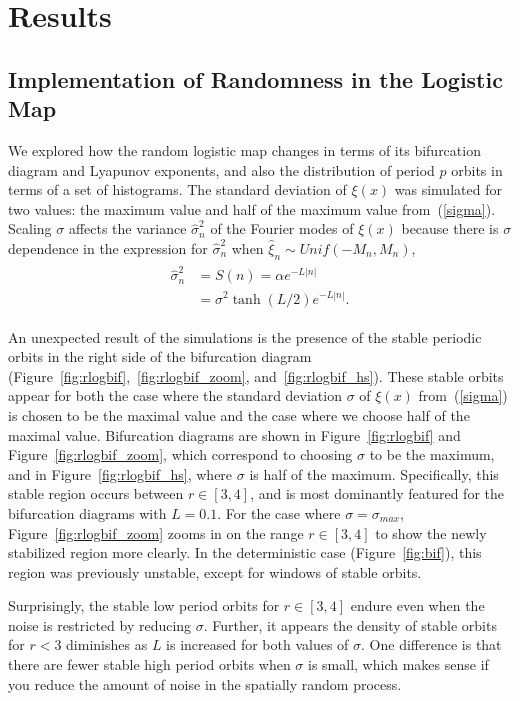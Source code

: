 \chapter{Results}\label{results}
\section{Implementation of Randomness in the Logistic Map}
We explored how the random logistic map changes in terms of its
bifurcation diagram and Lyapunov exponents, and also the distribution
of period $p$ orbits in terms of a set of histograms. The standard deviation of
$\xi(x)$ was simulated for two values: the maximum value and
half of the maximum value from~(\ref{sigma}). Scaling $\sigma$ affects
the variance $\hat{\sigma}_n^2$ of the Fourier modes of $\xi(x)$
because there is $\sigma$ dependence in the expression for
$\hat{\sigma}_n^2$ when $\hat{\xi}_n \sim Unif(-M_n,M_n)$,
\begin{align*}
\begin{split}
\hat{\sigma}_n^2 &= S(n) = \alpha e^{-L|n|}\\
&= \sigma^2 \tanh(L/2) e^{-L|n|}.
\end{split}
\end{align*}

An unexpected result of the simulations is the presence of the stable
periodic orbits in the right side of the bifurcation diagram
(Figure~\ref{fig:rlogbif},~\ref{fig:rlogbif_zoom}, and~\ref{fig:rlogbif_hs}). These
stable orbits appear for both the case where the standard deviation $\sigma$ of
$\xi(x)$ from~(\ref{sigma}) is chosen to be the maximal value and the
case where we choose half of the maximal
value. Bifurcation diagrams are shown in Figure~\ref{fig:rlogbif} and
Figure~\ref{fig:rlogbif_zoom}, which correspond to choosing $\sigma$
to be the maximum, and in Figure~\ref{fig:rlogbif_hs}, where $\sigma$ is half
of the maximum. Specifically, this stable region occurs between $r\in
[3,4]$, and is most dominantly featured for the bifurcation
diagrams with $L=0.1$. For the case where $\sigma=\sigma_{max}$, Figure~\ref{fig:rlogbif_zoom} zooms in on the
range $r \in [3,4]$ to show the newly stabilized region more clearly. In the
deterministic case (Figure~\ref{fig:bif}), this region was previously
unstable, except for windows of stable orbits. 

Surprisingly, the stable low period
orbits for $r \in [3,4]$ endure even
when the noise is restricted by reducing $\sigma$. Further, it appears the density of
stable orbits for $r<3$ diminishes as $L$ is increased for both values
of $\sigma$. One difference is that there are fewer stable high period
orbits when $\sigma$ is small, which makes sense if you reduce the
amount of noise in the spatially random process. 

